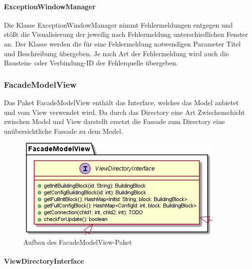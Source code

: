 \documentclass[parskip=full]{scrartcl}
\begin{document}
\paragraph{ExceptionWindowManager}

Die Klasse ExceptionWindowManager nimmt Fehlermeldungen entgegen und stößt die Visualisierung der jeweilig nach Fehlermeldung unterschiedlichen Fenster an. Der Klasse werden die für eine Fehlermeldung notwendigen Parameter Titel und  Beschreibung übergeben. Je nach Art der Fehlermeldung wird auch die Baustein- oder Verbindung-ID der Fehlerquelle übergeben.

\subsubsection {FacadeModelView}

Das Paket FacadeModelView enthält das Interface, welches das Model anbietet und vom View verwendet wird. Da durch das Directory eine Art Zwischenschicht zwischen Model und View darstellt ersetzt die Fassade zum Directory eine unübersichtliche Fassade zu dem Model. 

\begin{figure}[htbp]
	\begin{center}
		\includegraphics[width = 12 cm]{Grafiken/FacadeModelViewNamespace.png}
		\caption{Aufbau des FacadeModelView-Paket}
		\label{Entwurf_Grob}
	\end{center}
\end{figure}

\paragraph{ViewDirectoryInterface}
\end{document}
